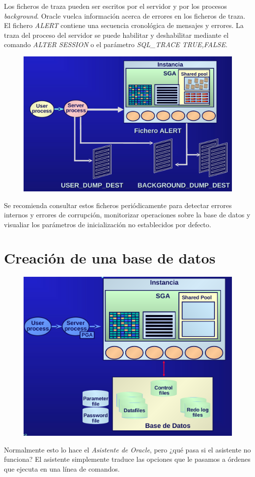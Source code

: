 Los ficheros de traza pueden ser escritos por el servidor y por los procesos \textit{background}. Oracle vuelca información acerca de errores en los ficheros de traza. El fichero \textit{ALERT} contiene una secuencia cronológica de mensajes y errores. La traza del proceso del servidor se puede habilitar y deshabilitar mediante el comando \textit{ALTER SESSION} o el parámetro \textit{SQL\_TRACE TRUE,FALSE}.
\begin{figure}[H]
  \center
  \includegraphics[scale=0.25]{img/p17.png}
\end{figure}
Se recomienda consultar estos ficheros periódicamente para detectar errores internos y errores de corrupción, monitorizar operaciones sobre la base de datos y visualiar los parámetros de inicialización no establecidos por defecto.

\section{Creación de una base de datos}

\begin{figure}[H]
  \center
  \includegraphics[scale=0.25]{img/p18.png}
\end{figure}
Normalmente esto lo hace el \textit{Asistente de Oracle}, pero ¿qué pasa si el asistente no funciona? El asistente simplemente traduce las opciones que le pasamos a órdenes que ejecuta en una línea de comandos.

